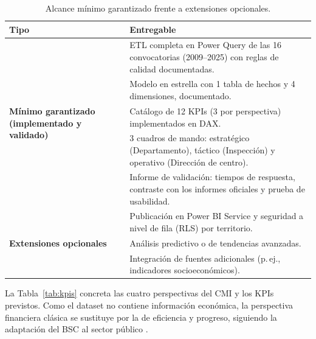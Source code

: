 \documentclass[12pt, a4paper, oneside]{report}
\begin{document}
\begin{table}[H]
\centering
\small
\renewcommand{\arraystretch}{1.1}
\begin{tabularx}{\textwidth}{@{} p{3.2cm} X @{}}
\toprule
\textbf{Tipo} & \textbf{Entregable} \\ \midrule
\multirow{5}{3.2cm}{\textbf{Mínimo garantizado (implementado y validado)}}
 & ETL completa en Power Query de las 16 convocatorias (2009--2025) con reglas de calidad documentadas. \\
 & Modelo en estrella con 1 tabla de hechos y 4 dimensiones, documentado. \\
 & Catálogo de 12 KPIs (3 por perspectiva) implementados en DAX. \\
 & 3 cuadros de mando: estratégico (Departamento), táctico (Inspección) y operativo (Dirección de centro). \\
 & Informe de validación: tiempos de respuesta, contraste con los informes oficiales y prueba de usabilidad. \\ \midrule
\multirow{3}{3.2cm}{\textbf{Extensiones opcionales}}
 & Publicación en Power BI Service y seguridad a nivel de fila (RLS) por territorio. \\
 & Análisis predictivo o de tendencias avanzadas. \\
 & Integración de fuentes adicionales (p.\,ej., indicadores socioeconómicos). \\ \bottomrule
\end{tabularx}
\caption{Alcance mínimo garantizado frente a extensiones opcionales.}
\label{tab:alcance}
\end{table}

La Tabla~\ref{tab:kpis} concreta las cuatro perspectivas del CMI y los KPIs previstos. Como el dataset no contiene información económica, la perspectiva financiera clásica se sustituye por la de eficiencia y progreso, siguiendo la adaptación del BSC al sector público \cite{niven2008balanced}.
\end{document}
